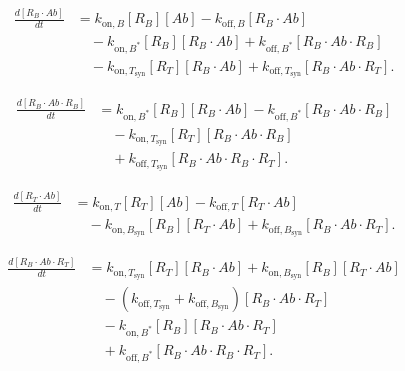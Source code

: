 \documentclass[11pt]{article}
\begin{document}
\begin{equation}
\begin{aligned}
\frac{d[R_B\cdot Ab]}{dt} &= k_{\mathrm{on},B}[R_B][Ab]-k_{\mathrm{off},B}[R_B\cdot Ab]\\ &\quad-k_{\mathrm{on},B^{*}}[R_B][R_B\cdot Ab]+k_{\mathrm{off},B^{*}}[R_B\cdot Ab\cdot R_B]\\ &\quad-k_{\mathrm{on},T_{\mathrm{syn}}}[R_T][R_B\cdot Ab]+k_{\mathrm{off},T_{\mathrm{syn}}}[R_B\cdot Ab\cdot R_T].
\end{aligned}
\label{eq:glofit-binary-b}
\end{equation}


\begin{equation}
\begin{aligned}
\frac{d[R_B\cdot Ab\cdot R_B]}{dt} &= k_{\mathrm{on},B^{*}}[R_B][R_B\cdot Ab]-k_{\mathrm{off},B^{*}}[R_B\cdot Ab\cdot R_B]\\ &\quad-k_{\mathrm{on},T_{\mathrm{syn}}}[R_T][R_B\cdot Ab\cdot R_B]\\ &\quad+k_{\mathrm{off},T_{\mathrm{syn}}}[R_B\cdot Ab\cdot R_B\cdot R_T].
\end{aligned}
\label{eq:glofit-anchor}
\end{equation}


\begin{equation}
\begin{aligned}
\frac{d[R_T\cdot Ab]}{dt} &= k_{\mathrm{on},T}[R_T][Ab]-k_{\mathrm{off},T}[R_T\cdot Ab]\\ &\quad-k_{\mathrm{on},B_{\mathrm{syn}}}[R_B][R_T\cdot Ab]+k_{\mathrm{off},B_{\mathrm{syn}}}[R_B\cdot Ab\cdot R_T].
\end{aligned}
\label{eq:glofit-binary-t}
\end{equation}


\begin{equation}
\begin{aligned}
\frac{d[R_B\cdot Ab\cdot R_T]}{dt} &= k_{\mathrm{on},T_{\mathrm{syn}}}[R_T][R_B\cdot Ab]+k_{\mathrm{on},B_{\mathrm{syn}}}[R_B][R_T\cdot Ab]\\ &\quad-\left(k_{\mathrm{off},T_{\mathrm{syn}}}+k_{\mathrm{off},B_{\mathrm{syn}}}\right)[R_B\cdot Ab\cdot R_T]\\ &\quad-k_{\mathrm{on},B^{*}}[R_B][R_B\cdot Ab\cdot R_T]\\ &\quad+k_{\mathrm{off},B^{*}}[R_B\cdot Ab\cdot R_B\cdot R_T].
\end{aligned}
\label{eq:glofit-synapse}
\end{equation}
\end{document}
